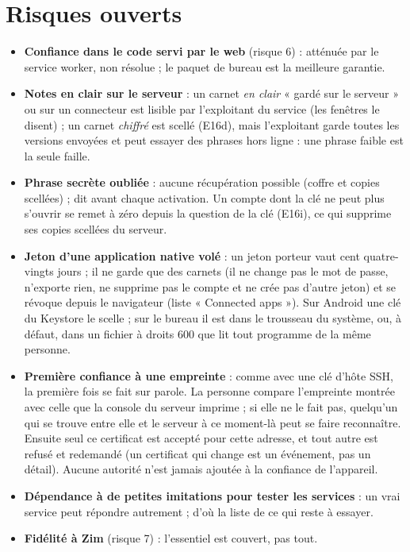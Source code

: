 \documentclass[10pt,a4paper]{article}
\begin{document}
\section{Risques ouverts}
\begin{itemize}
\item \textbf{Confiance dans le code servi par le web} (risque 6) : atténuée par le service worker, non résolue ; le paquet de bureau est la meilleure garantie.
\item \textbf{Notes en clair sur le serveur} : un carnet \emph{en clair} « gardé sur le serveur » ou sur un connecteur est lisible par l'exploitant du service (les fenêtres le disent) ; un carnet \emph{chiffré} est scellé (E16d), mais l'exploitant garde toutes les versions envoyées et peut essayer des phrases hors ligne : une phrase faible est la seule faille.
\item \textbf{Phrase secrète oubliée} : aucune récupération possible (coffre et copies scellées) ; dit avant chaque activation. Un compte dont la clé ne peut plus s'ouvrir se remet à zéro depuis la question de la clé (E16i), ce qui supprime ses copies scellées du serveur.
\item \textbf{Jeton d'une application native volé} : un jeton porteur vaut cent quatre-vingts jours ; il ne garde que des carnets (il ne change pas le mot de passe, n'exporte rien, ne supprime pas le compte et ne crée pas d'autre jeton) et se révoque depuis le navigateur (liste « Connected apps »). Sur Android une clé du Keystore le scelle ; sur le bureau il est dans le trousseau du système, ou, à défaut, dans un fichier à droits 600 que lit tout programme de la même personne.
\item \textbf{Première confiance à une empreinte} : comme avec une clé d'hôte SSH, la première fois se fait sur parole. La personne compare l'empreinte montrée avec celle que la console du serveur imprime ; si elle ne le fait pas, quelqu'un qui se trouve entre elle et le serveur à ce moment-là peut se faire reconnaître. Ensuite seul ce certificat est accepté pour cette adresse, et tout autre est refusé et redemandé (un certificat qui change est un événement, pas un détail). Aucune autorité n'est jamais ajoutée à la confiance de l'appareil.
\item \textbf{Dépendance à de petites imitations pour tester les services} : un vrai service peut répondre autrement ; d'où la liste de ce qui reste à essayer.
\item \textbf{Fidélité à Zim} (risque 7) : l'essentiel est couvert, pas tout.
\end{itemize}
\end{document}
